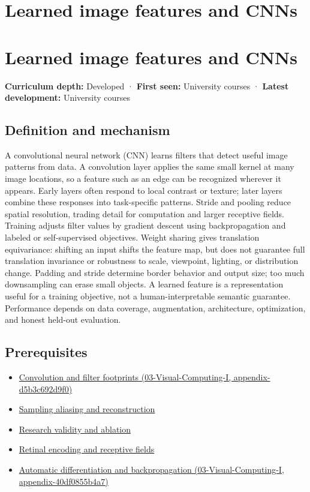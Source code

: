 \hypertarget{appendix-47c51ea026fb}{}
\section*{Learned image features and CNNs}
\section{Learned image features and CNNs}\label{appendix-47c51ea026fb-learned-image-features-and-cnns}

\textbf{Curriculum depth:} Developed · \textbf{First seen:} University courses · \textbf{Latest development:} University courses

\subsection{Definition and mechanism}\label{appendix-47c51ea026fb-definition-and-mechanism}

A convolutional neural network (CNN) learns filters that detect useful image patterns from data. A convolution layer applies the same small kernel at many image locations, so a feature such as an edge can be recognized wherever it appears. Early layers often respond to local contrast or texture; later layers combine these responses into task-specific patterns. Stride and pooling reduce spatial resolution, trading detail for computation and larger receptive fields. Training adjusts filter values by gradient descent using backpropagation and labeled or self-supervised objectives. Weight sharing gives translation equivariance: shifting an input shifts the feature map, but does not guarantee full translation invariance or robustness to scale, viewpoint, lighting, or distribution change. Padding and stride determine border behavior and output size; too much downsampling can erase small objects. A learned feature is a representation useful for a training objective, not a human-interpretable semantic guarantee. Performance depends on data coverage, augmentation, architecture, optimization, and honest held-out evaluation.

\subsection{Prerequisites}\label{appendix-47c51ea026fb-prerequisites}

\begin{itemize}
\tightlist
\item
  \href{../03-Visual-Computing-I/main.pdf\#nameddest=appendix-d5b3c692d9f0}{Convolution and filter footprints (03-Visual-Computing-I, appendix-d5b3c692d9f0)}
\item
  \hyperref[appendix-6a7869dd79a6]{Sampling aliasing and reconstruction}
\item
  \hyperref[appendix-65788587ef78]{Research validity and ablation}
\item
  \hyperref[appendix-7281c15ac44a]{Retinal encoding and receptive fields}
\item
  \href{../03-Visual-Computing-I/main.pdf\#nameddest=appendix-40df0855b4a7}{Automatic differentiation and backpropagation (03-Visual-Computing-I, appendix-40df0855b4a7)}
\end{itemize}

